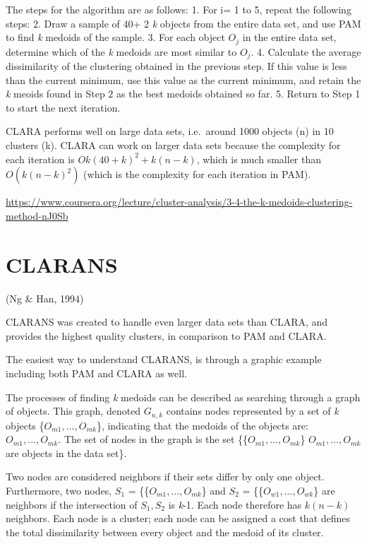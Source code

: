 \documentclass[12pt,twoside]{amherstthesis}
\begin{document}
  The steps for the algorithm are as follows: 1. For i= 1 to 5, repeat the
  following steps: 2. Draw a sample of 40+ 2 \emph{k} objects from the
  entire data set, and use PAM to find \emph{k} medoids of the sample. 3.
  For each object \(O_j\) in the entire data set, determine which of the
  \emph{k} medoids are most similar to \(O_j\). 4. Calculate the average
  dissimilarity of the clustering obtained in the previous step. If this
  value is less than the current minimum, use this value as the current
  minimum, and retain the \emph{k} meoids found in Step 2 as the best
  medoids obtained so far. 5. Return to Step 1 to start the next
  iteration.
  
  CLARA performs well on large data sets, i.e.~around 1000 objects (n) in
  10 clusters (k). CLARA can work on larger data sets because the
  complexity for each iteration is \(O{k(40 + k)^2 + k(n-k)}\), which is
  much smaller than \(O(k(n-k)^2)\) (which is the complexity for each
  iteration in PAM).
  
  \url{https://www.coursera.org/lecture/cluster-analysis/3-4-the-k-medoids-clustering-method-nJ0Sb}
  
  \section{CLARANS}\label{clarans}
  
  (Ng \& Han, 1994)
  
  CLARANS was created to handle even larger data sets than CLARA, and
  provides the highest quality clusters, in comparison to PAM and CLARA.
  
  The easiest way to understand CLARANS, is through a graphic example
  including both PAM and CLARA as well.
  
  The processes of finding \emph{k} medoids can be described as searching
  through a graph of objects. This graph, denoted \(G_{n,k}\) contains
  nodes represented by a set of \emph{k} objects
  \{\(O_{m1},... , O_{mk}\)\}, indicating that the medoids of the objects
  are: \(O_{m1},... , O_{mk}\). The set of nodes in the graph is the set
  \{\{\(O_{m1},... , O_{mk}\)\} \textbar{} \(O_{m1},... , O_{mk}\) are
  objects in the data set\}.
  
  Two nodes are considered neighbors if their sets differ by only one
  object. Furthermore, two nodes, \(S_1\) = \{\{\(O_{m1},... , O_{mk}\)\}
  and \(S_2\) = \{\{\(O_{w1},... , O_{wk}\)\} are neighbors if the
  intersection of \(S_1, S_2\) is \emph{k}-1. Each node therefore has
  \(k(n-k)\) neighbors. Each node is a cluster; each node can be assigned
  a cost that defines the total dissimilarity between every object and the
  medoid of its cluster.
  
\end{document}
